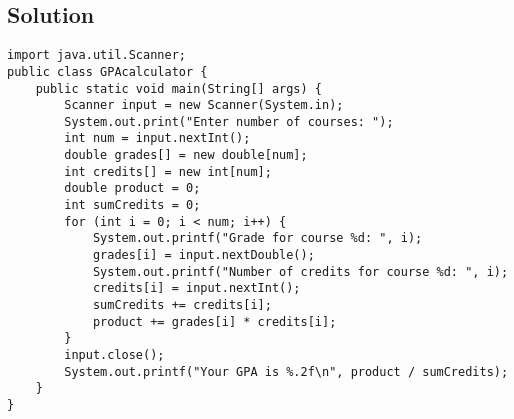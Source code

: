 \documentclass[12pt,letterpaper,twoside]{article}
\begin{document}
\subsection*{Solution}

\begin{lstlisting}
import java.util.Scanner;
public class GPAcalculator {
	public static void main(String[] args) {
		Scanner input = new Scanner(System.in);
		System.out.print("Enter number of courses: ");
		int num = input.nextInt();
		double grades[] = new double[num];
		int credits[] = new int[num];
		double product = 0;
		int sumCredits = 0;
		for (int i = 0; i < num; i++) {
			System.out.printf("Grade for course %d: ", i);
			grades[i] = input.nextDouble();
			System.out.printf("Number of credits for course %d: ", i);
			credits[i] = input.nextInt();
			sumCredits += credits[i];
			product += grades[i] * credits[i];
		}
		input.close();
		System.out.printf("Your GPA is %.2f\n", product / sumCredits);
	}
}
\end{lstlisting}
\end{document}
